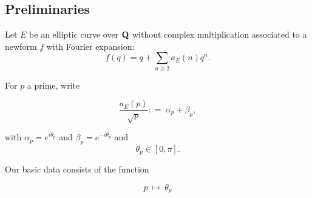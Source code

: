 \documentclass[11pt]{article}
\theoremstyle{plain}
\theoremstyle{definition}
\numberwithin{equation}{section}
\numberwithin{figure}{section}
\numberwithin{table}{section}
\def\Q{\bf{Q}}
\begin{document}

 \subsection{Preliminaries}

Let $E$ be an elliptic curve over ${\Q}$ without complex multiplication associated to a newform $f$ with Fourier expansion:
$$f(q) = q+\sum_{n\ge 2}a_E(n)q^n.$$

For $p$ a prime, write

\begin{equation}
{\frac{a_E(p)}{\sqrt p}}: = \   \alpha_p+\beta_p,
\end{equation}

with $\alpha_p= e^{i\theta_p}$ and  $\beta_p= e^{-i\theta_p}$
and
\begin{equation}
  \theta_p \in [0, \pi].
\end{equation}


Our basic data consists of the function

\begin{equation}\label{data}
p \ \mapsto\ \theta_p
\end{equation}
\end{document}
